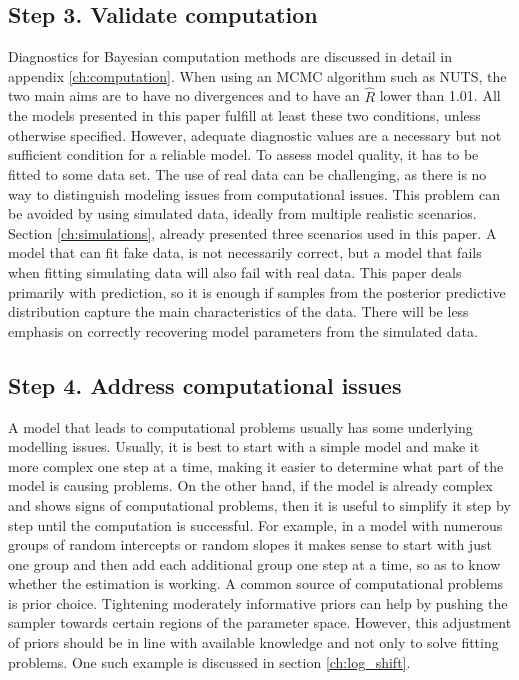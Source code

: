\subsection{Step 3. Validate computation}

Diagnostics for Bayesian computation methods are discussed in detail in appendix \ref{ch:computation}.
When using an MCMC algorithm such as NUTS, the two main aims are to have no divergences and to have an $\hat R$ lower than 1.01.
All the models presented in this paper fulfill at least these two conditions, unless otherwise specified.
However, adequate diagnostic values are a necessary but not sufficient condition for a reliable model.
To assess model quality, it has to be fitted to some data set.
The use of real data can be challenging, as there is no way to distinguish modeling issues from computational issues.
This problem can be avoided by using simulated data, ideally from multiple realistic scenarios.
Section \ref{ch:simulations}, already presented three scenarios used in this paper.
A model that can fit fake data, is not necessarily correct, but a model that fails when fitting simulating data will also fail with real data.
This paper deals primarily with prediction, so it is enough if samples from the posterior predictive distribution capture the main characteristics of the data.
There will be less emphasis on correctly recovering model parameters from the simulated data.


\subsection{Step 4. Address computational issues}

A model that leads to computational problems usually has some underlying modelling issues.
Usually, it is best to start with a simple model and make it more complex one step at a time, making it easier to determine what part of the model is causing problems.
On the other hand, if the model is already complex and shows signs of computational problems, then it is useful to simplify it step by step until the computation is successful.
For example, in a model with numerous groups of random intercepts or random slopes it makes sense to start with just one group and then add each additional group one step at a time, so as to know whether the estimation is working.
A common source of computational problems is prior choice.
Tightening moderately informative priors can help by pushing the sampler towards certain regions of the parameter space.
However, this adjustment of priors should be in line with available knowledge and not only to solve fitting problems.
One such example is discussed in section \ref{ch:log_shift}.

